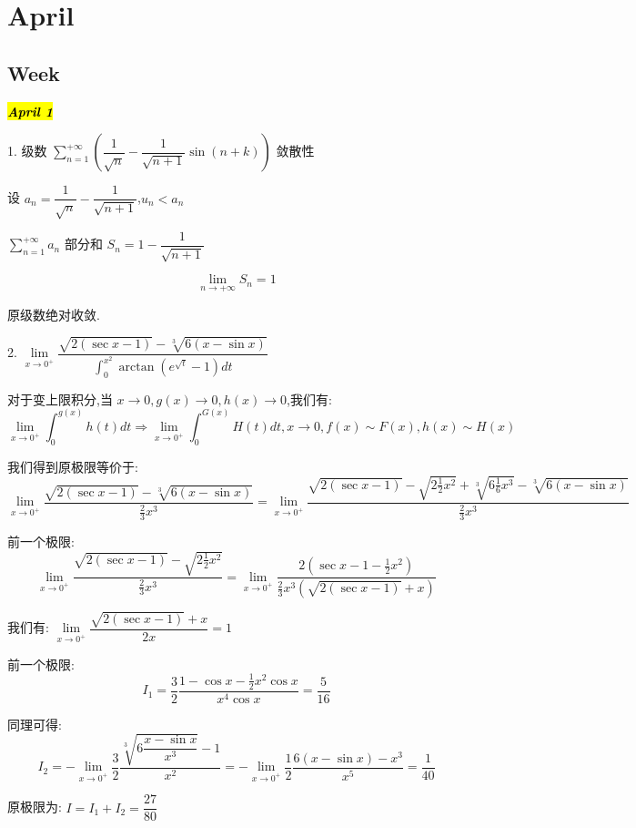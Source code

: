 \chapter{April}
\section{Week }
\hl{\textbf{\textit{April 1}}}

1. 级数 $\sum\limits_{n=1}^{+\infty}(\dfrac{1}{\sqrt{n}}-\dfrac{1}{\sqrt{n+1}}\sin(n+k))$ 敛散性
\begin{solution}
	
	设 $a_{n}=\dfrac{1}{\sqrt{n}}-\dfrac{1}{\sqrt{n+1}}$,$u_{n}<a_{n}$
	
	$\sum\limits_{n=1}^{+\infty}a_{n}$ 部分和 $S_{n}=1-\dfrac{1}{\sqrt{n+1}}$
	
	$$\lim\limits_{n\rightarrow +\infty}S_{n}=1$$
	
	原级数绝对收敛.
\end{solution}

2. $\lim\limits_{x\rightarrow 0^{+}}\dfrac{\sqrt{2(\sec x-1)}-\sqrt[3]{6(x-\sin x)}}{\int_{0}^{x^2}\arctan (e^{\sqrt{t}}-1)dt}$
\begin{solution}
	
	对于变上限积分,当 $x\rightarrow 0,g(x)\rightarrow 0,h(x)\rightarrow 0$,我们有: 
	$$\lim\limits_{x\rightarrow 0^{+}}\int_{0}^{g(x)}h(t)dt\Rightarrow \lim\limits_{x\rightarrow 0^{+}}\int_{0}^{G(x)}H(t)dt,x\rightarrow 0,f(x)\sim F(x),h(x)\sim H(x)$$
	
	我们得到原极限等价于: 
	$$\lim\limits_{x\rightarrow 0^{+}}\frac{\sqrt{2(\sec x-1)}-\sqrt[3]{6(x-\sin x)}}{\frac{2}{3}x^3}=\lim\limits_{x\rightarrow 0^{+}}\frac{\sqrt{2(\sec x-1)}-\sqrt{2\frac{1}{2}x^2}+\sqrt[3]{6\frac{1}{6}x^3}-\sqrt[3]{6(x-\sin x)}}{\frac{2}{3}x^3}$$
	
	前一个极限: $$\lim\limits_{x\rightarrow 0^{+}}\frac{\sqrt{2(\sec x-1)}-\sqrt{2\frac{1}{2}x^2}}{\frac{2}{3}x^3}=\lim\limits_{x\rightarrow 0^{+}}\frac{2(\sec x-1-\frac{1}{2}x^2)}{\frac{2}{3}x^3(\sqrt{2(\sec x-1)}+x)}$$
	
	我们有: $\lim\limits_{x\rightarrow 0^{+}}\dfrac{\sqrt{2(\sec x-1)}+x}{2x}=1$
	
	前一个极限: $$I_{1}=\frac{3}{2}\frac{1-\cos x-\frac{1}{2}x^2\cos x}{x^4\cos x}=\frac{5}{16}$$
	
	同理可得: $$I_{2}=-\lim\limits_{x\rightarrow 0^{+}}\frac{3}{2}\frac{\sqrt[3]{6\dfrac{x-\sin x}{x^3}}-1}{x^2}=-\lim\limits_{x\rightarrow 0^{+}}\frac{1}{2}\frac{6(x-\sin x)-x^3}{x^5}=\frac{1}{40}$$
	
	原极限为: $I=I_{1}+I_{2}=\dfrac{27}{80}$
\end{solution}

